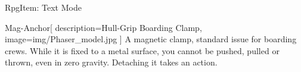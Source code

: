 \begin{ExampleBlock}{RpgItem: Text Mode}
\begin{RpgItem}{Mag-Anchor}[
    description={Hull-Grip Boarding Clamp},
    image={img/Phaser_model.jpg}
]
    A magnetic clamp, standard issue for boarding crews. While it is fixed to a metal surface, you cannot be pushed, pulled or thrown, even in zero gravity. Detaching it takes an action.
\end{RpgItem}


\end{ExampleBlock}
